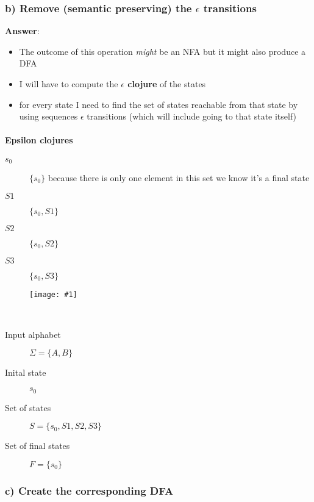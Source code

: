 \documentclass[a4paper, 14pt]{report}
\newcommand{\centeredimg}[1]{%
	\begin{figure}[h]
		\begin{center}
			\texttt{[image: \#1]}
		\end{center}
\end{figure}}
\newcommand{\answer}[1]{%
	\begin{flushleft}
		\textbf{Answer}:\\
			#1
	\end{flushleft}}
\begin{document}
\pagebreak

\subsubsection*{b) Remove (semantic preserving) the $ \epsilon $ transitions}

\answer{%

	\begin{itemize}		
		\item The outcome of this operation \textit{might} be an NFA but it might also produce a DFA
		\item I will have to compute the \textbf{$\epsilon$ clojure} of the
			states
		\item for every state I need to find the set of states reachable from
			that state by using sequences $\epsilon$ transitions (which will include going to that state itself)
	\end{itemize}

	\paragraph{Epsilon clojures}

	\begin{description}
	  \item [$s_0$] $\{s_0\}$ because there is only one element in this set we know it's a final state
	  \item [$S1$] $\{s_0, S1\}$
	  \item [$S2$] $\{s_0, S2\}$
	  \item [$S3$] $\{s_0, S3\}$
	\end{description}

	\centeredimg{rl_1_b.png} \\

	\hline

	\begin{description}
		\item [Input alphabet] $\Sigma = \{A, B\}$
		\item [Inital state] $s_0$
		\item [Set of states] $S = \{s_0, S1, S2, S3\}$
		\item [Set of final states] $F = \{s_0\}$
	\end{description}

	\hline
} 

\pagebreak

\subsubsection*{c) Create the corresponding DFA}
\end{document}
